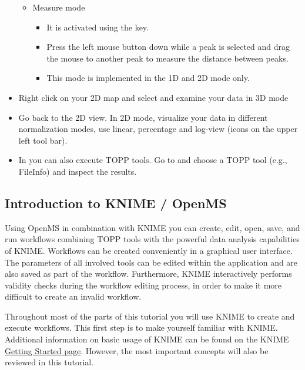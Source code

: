 \begin{itemize}
\begin{itemize}
\begin{itemize}
        \end{itemize}
    \item Measure mode
        \begin{itemize}
        \item It is activated using the \keys{\shift} key.
        \item Press the left mouse button down while a peak is selected and drag the mouse to
        			another peak to measure the distance between peaks.
        \item This mode is implemented in the 1D and 2D mode only.
        \end{itemize}
    \end{itemize}
\item Right click on your 2D map and select  and examine your
			data in 3D mode
\item Go back to the 2D view. In 2D mode, visualize your data in different normalization modes, use linear, percentage and log-view (icons on the upper left tool bar).
\item In  you can also execute TOPP tools. Go to
			 and choose a TOPP tool (e.g., FileInfo) and
			inspect the results.
\end{itemize}


\subsection{Introduction to KNIME / OpenMS}
\label{KNIME_Intro}

Using OpenMS in combination with KNIME you can create, edit, open, save, and run workflows
combining TOPP tools with the powerful data analysis capabilities of KNIME. Workflows can
be created conveniently in a graphical user interface. The parameters of all involved
tools can be edited within the application and are also saved as part of the workflow.
Furthermore, KNIME interactively performs validity checks during the workflow editing
process, in order to make it more difficult to create an invalid workflow.

Throughout most of the parts of this tutorial you will use KNIME to create and
execute workflows. This first step is to make yourself familiar with KNIME. Additional
information on basic usage of KNIME can be found on the KNIME
\href{https://tech.knime.org/knime}{Getting Started page}. However,
the most important concepts will also be reviewed in this tutorial.


